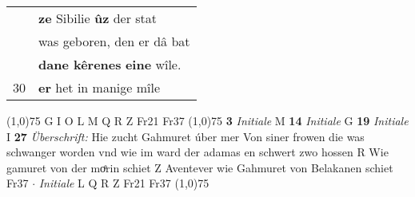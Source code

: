 \documentclass[8pt,a4paper,notitlepage]{article}
\begin{document}
\begin{table}[ht]
\begin{minipage}[t]{0.5\linewidth}
\begin{tabular}{rl}
 & \textbf{ze} Sibilie \textbf{ûz} der stat\\ 
 & was geboren, den er dâ bat\\ 
 & \textbf{dane kêrenes} \textbf{eine} wîle.\\ 
30 & \textbf{er} het in manige mîle\\ 
\end{tabular}
\scriptsize
\line(1,0){75} \newline
G I O L M Q R Z Fr21 Fr37 \newline
\line(1,0){75} \newline
\textbf{3} \textit{Initiale} M  \textbf{14} \textit{Initiale} G  \textbf{19} \textit{Initiale} I  \textbf{27} \textit{Überschrift:} Hie zucht Gahmuret úber mer Von siner frowen die was schwanger worden vnd wie im ward der adamas en schwert zwo hossen R  Wie gamuret von der moͤrin schiet Z  Aventever wie Gahmuret von Belakanen schiet Fr37   $\cdot$ \textit{Initiale} L Q R Z Fr21 Fr37  \newline
\line(1,0){75} \newline

\end{minipage}
\end{table}
\end{document}
